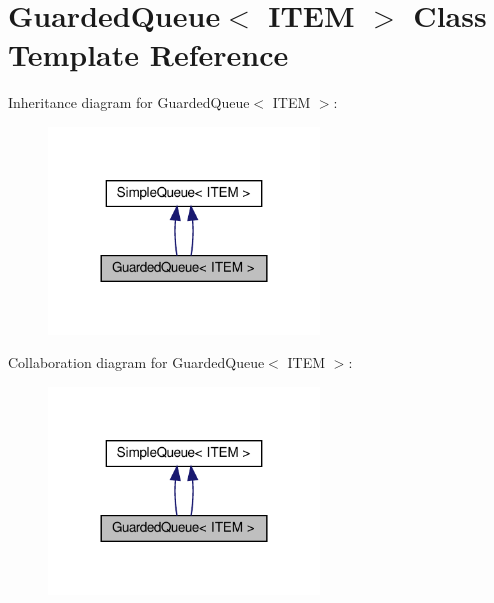 \hypertarget{classGuardedQueue}{}\section{Guarded\+Queue$<$ I\+T\+EM $>$ Class Template Reference}
\label{classGuardedQueue}


Inheritance diagram for Guarded\+Queue$<$ I\+T\+EM $>$\+:\nopagebreak
\begin{figure}[H]
\begin{center}
\leavevmode
\includegraphics[width=204pt]{classGuardedQueue__inherit__graph}
\end{center}
\end{figure}


Collaboration diagram for Guarded\+Queue$<$ I\+T\+EM $>$\+:\nopagebreak
\begin{figure}[H]
\begin{center}
\leavevmode
\includegraphics[width=204pt]{classGuardedQueue__coll__graph}
\end{center}
\end{figure}
